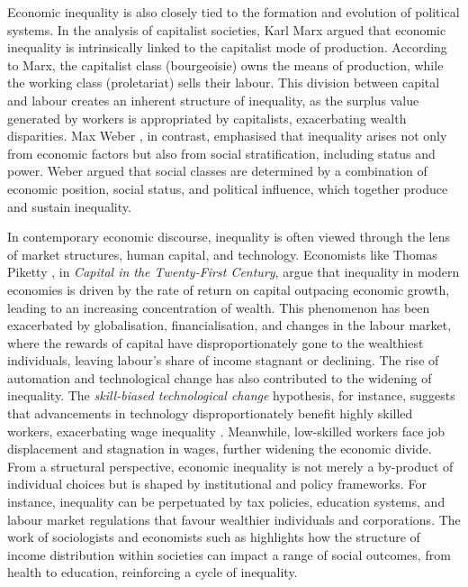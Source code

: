 \documentclass[12pt]{article}
\begin{document}
Economic inequality is also closely tied to the formation and evolution of political systems. In the analysis of capitalist societies, Karl Marx \parencite*{marx1867} argued that economic inequality is intrinsically linked to the capitalist mode of production. According to Marx, the capitalist class (bourgeoisie) owns the means of production, while the working class (proletariat) sells their labour. This division between capital and labour creates an inherent structure of inequality, as the surplus value generated by workers is appropriated by capitalists, exacerbating wealth disparities. Max Weber \parencite*{weber1922}, in contrast, emphasised that inequality arises not only from economic factors but also from social stratification, including status and power. Weber argued that social classes are determined by a combination of economic position, social status, and political influence, which together produce and sustain inequality.

In contemporary economic discourse, inequality is often viewed through the lens of market structures, human capital, and technology. Economists like Thomas Piketty \parencite*{piketty2014capital}, in \textit{Capital in the Twenty-First Century}, argue that inequality in modern economies is driven by the rate of return on capital outpacing economic growth, leading to an increasing concentration of wealth. This phenomenon has been exacerbated by globalisation, financialisation, and changes in the labour market, where the rewards of capital have disproportionately gone to the wealthiest individuals, leaving labour's share of income stagnant or declining. The rise of automation and technological change has also contributed to the widening of inequality. The \textit{skill-biased technological change} hypothesis, for instance, suggests that advancements in technology disproportionately benefit highly skilled workers, exacerbating wage inequality \parencite{acemoglu2002technical}. Meanwhile, low-skilled workers face job displacement and stagnation in wages, further widening the economic divide. From a structural perspective, economic inequality is not merely a by-product of individual choices but is shaped by institutional and policy frameworks. For instance, inequality can be perpetuated by tax policies, education systems, and labour market regulations that favour wealthier individuals and corporations. The work of sociologists and economists such as \textcite{Pickett2009} highlights how the structure of income distribution within societies can impact a range of social outcomes, from health to education, reinforcing a cycle of inequality. 
\end{document}
